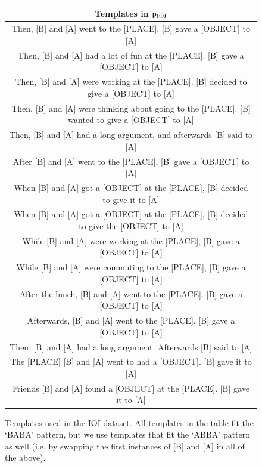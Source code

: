 \begin{figure}[H]
\centering
\begin{tabular}{ |c| } 
\hline
Templates in $\mathsf{p}_{\mathrm{IOI}}$ \\ 
\hline 
Then, [B] and [A] went to the [PLACE]. [B] gave a [OBJECT] to [A] \\
\hline
Then, [B] and [A] had a lot of fun at the [PLACE]. [B] gave a [OBJECT] to [A] \\
\hline
Then, [B] and [A] were working at the [PLACE]. [B] decided to give a [OBJECT] to [A] \\
\hline
Then, [B] and [A] were thinking about going to the [PLACE]. [B] wanted to give a [OBJECT] to [A] \\
\hline
Then, [B] and [A] had a long argument, and afterwards [B] said to [A] \\
\hline

After [B] and [A] went to the [PLACE], [B] gave a [OBJECT] to [A] \\
\hline

When [B] and [A] got a [OBJECT] at the [PLACE], [B] decided to give it to [A] \\
\hline

When [B] and [A] got a [OBJECT] at the [PLACE], [B] decided to give the [OBJECT] to [A] \\
\hline

While [B] and [A] were working at the [PLACE], [B] gave a [OBJECT] to [A] \\
\hline
While [B] and [A] were commuting to the [PLACE], [B] gave a [OBJECT] to [A] \\
\hline
After the lunch, [B] and [A] went to the [PLACE]. [B] gave a [OBJECT] to [A] \\
\hline
Afterwards, [B] and [A] went to the [PLACE]. [B] gave a [OBJECT] to [A] \\
\hline

Then, [B] and [A] had a long argument. Afterwards [B] said to [A] \\
\hline

The [PLACE] [B] and [A] went to had a [OBJECT]. [B] gave it to [A] \\
\hline

Friends [B] and [A] found a [OBJECT] at the [PLACE]. [B] gave it to [A] \\
\hline
\end{tabular}
\caption{Templates used in the IOI dataset. All templates in the table fit the `BABA' pattern, but we use templates that fit the `ABBA' pattern as well (i.e, by swapping the first instances of [B] and [A] in all of the above).}
\label{fig:table_templates}
\end{figure}

